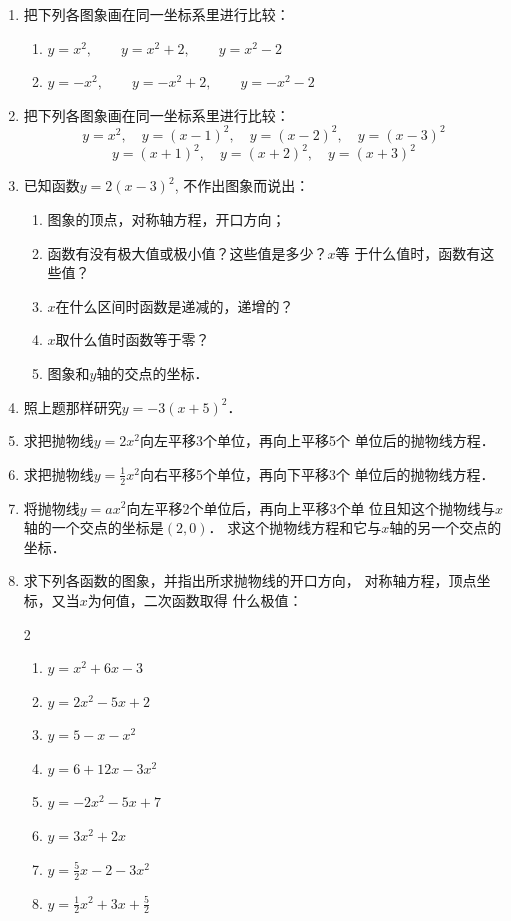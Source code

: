 \begin{enumerate}
    \item 把下列各图象画在同一坐标系里进行比较：
\begin{enumerate}
    \item $y=x^2,\qquad  y=x^2+2,\qquad  y=x^2-2$
    \item $y=-x^2,\qquad y=-x^2+2,\qquad y=-x^2-2$
\end{enumerate}

    \item 把下列各图象画在同一坐标系里进行比较：
  \[  y=x^2,\quad     y=(x-1)^2,\quad    y=(x-2)^2,\quad     y=(x-3)^2\]
 \[   y=(x+1)^2,\quad     y=(x+2)^2,\quad     y=(x+3)^2\]
    \item 已知函数$y=2(x-3)^2$, 不作出图象而说出：
\begin{enumerate}
\item 图象的顶点，对称轴方程，开口方向；
\item 函数有没有极大值或极小值？这些值是多少？$x$等
    于什么值时，函数有这些值？
    \item $x$在什么区间时函数是递减的，递增的？
    \item $x$取什么值时函数等于零？
    \item 图象和$y$轴的交点的坐标．
\end{enumerate}

    \item 照上题那样研究$y=-3(x+5)^2$．
    \item 求把抛物线$y=2x^2$向左平移3个单位，再向上平移5个
    单位后的抛物线方程．
    \item 求把抛物线$y=\frac{1}{2}x^2$向右平移5个单位，再向下平移3个
    单位后的抛物线方程．
    \item 将抛物线$y=ax^2$向左平移2个单位后，再向上平移3个单
    位且知这个抛物线与$x$轴的一个交点的坐标是$(2,0)$．
    求这个抛物线方程和它与$x$轴的另一个交点的坐标．
    \item 求下列各函数的图象，并指出所求抛物线的开口方向，
    对称轴方程，顶点坐标，又当$x$为何值，二次函数取得
    什么极值：
\begin{multicols}{2}
    \begin{enumerate}
        \item $y=x^2+6x-3$
        \item $y=2x^2-5x+2$
        \item $y=5-x-x^2$
        \item $y=6+12x-3x^2$
        \item $y=-2x^2-5x+7$
        \item $y=3x^2+2x$
        \item $y=\frac{5}{2}x-2-3x^2$
        \item $y=\frac{1}{2}x^2+3x+\frac{5}{2}$
    \end{enumerate}
\end{multicols}


\end{enumerate}
